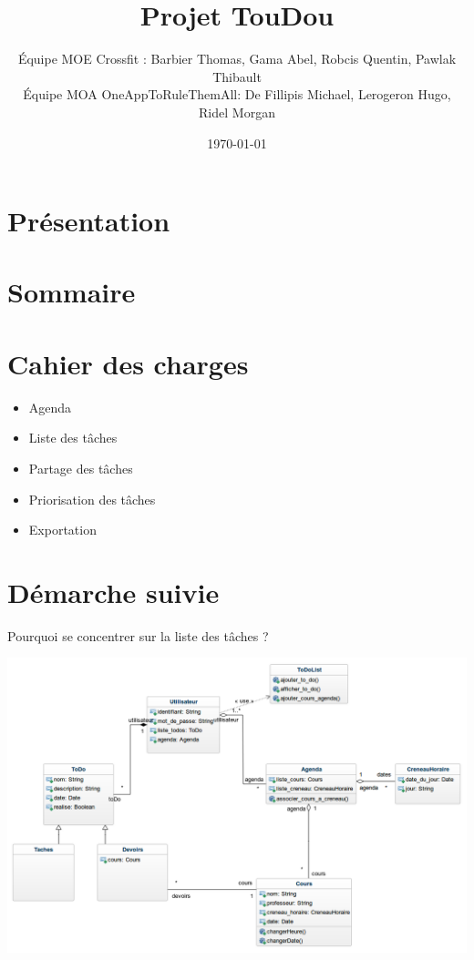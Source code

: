\documentclass[french]{beamer}
\title{Projet TouDou}
\author{Équipe MOE Crossfit : Barbier Thomas, Gama Abel, Robcis Quentin, Pawlak Thibault \\
Équipe MOA OneAppToRuleThemAll: De Fillipis Michael, Lerogeron Hugo, Ridel Morgan }
\institute[]{INSA de Rouen}
\date{\today}
\begin{document}
\section{Présentation}
\begin{frame}
\titlepage
\end{frame}

\section{Sommaire}
\begin{frame}
\tableofcontents
\end{frame}

\section{Cahier des charges}
\begin{frame}
\begin{itemize}
  \item Agenda
  \item Liste des tâches
  \item Partage des tâches
  \item Priorisation des tâches
  \item Exportation
\end{itemize}
\end{frame}

\section{Démarche suivie}
\begin{frame}
  \begin{center}
    Pourquoi se concentrer sur la liste des tâches ?
  \begin{minipage}[c]{0.6\linewidth}%
   \includegraphics[width=1\linewidth]{mdd}  %
  \end{minipage}
\end{center}
\end{frame}
\end{document}
